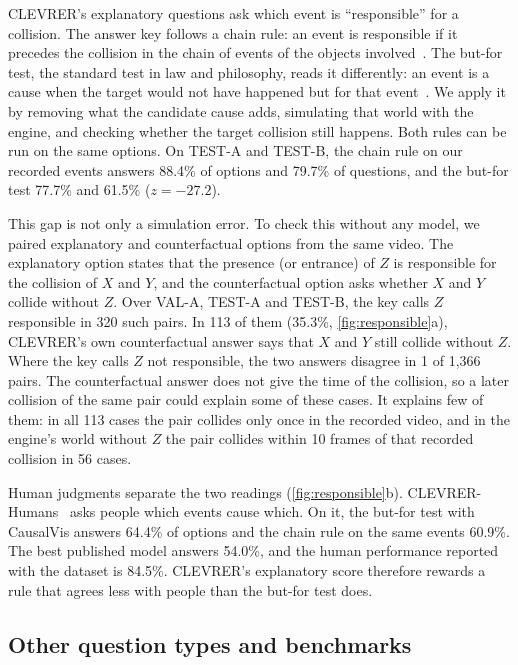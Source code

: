 \documentclass[10pt,twocolumn,letterpaper]{article}
\newcommand{\sys}{CausalVis}
\begin{document}
CLEVRER's explanatory questions ask which event is ``responsible'' for a collision.
The answer key follows a chain rule: an event is responsible if it precedes the collision in the chain of events of the objects involved~\cite{yi2020clevrer}.
The but-for test, the standard test in law and philosophy, reads it differently: an event is a cause when the target would not have happened but for that event~\cite{lewis1973causation,gerstenberg2021csm}.
We apply it by removing what the candidate cause adds, simulating that world with the engine, and checking whether the target collision still happens.
Both rules can be run on the same options.
On TEST-A and TEST-B, the chain rule on our recorded events answers 88.4\% of options and 79.7\% of questions, and the but-for test 77.7\% and 61.5\% ($z=-27.2$).

This gap is not only a simulation error.
To check this without any model, we paired explanatory and counterfactual options from the same video.
The explanatory option states that the presence (or entrance) of $Z$ is responsible for the collision of $X$ and $Y$, and the counterfactual option asks whether $X$ and $Y$ collide without $Z$.
Over VAL-A, TEST-A and TEST-B, the key calls $Z$ responsible in 320 such pairs.
In 113 of them (35.3\%, \cref{fig:responsible}a), CLEVRER's own counterfactual answer says that $X$ and $Y$ still collide without $Z$.
Where the key calls $Z$ not responsible, the two answers disagree in 1 of 1,366 pairs.
The counterfactual answer does not give the time of the collision, so a later collision of the same pair could explain some of these cases.
It explains few of them: in all 113 cases the pair collides only once in the recorded video, and in the engine's world without $Z$ the pair collides within 10 frames of that recorded collision in 56 cases.

Human judgments separate the two readings (\cref{fig:responsible}b).
CLEVRER-Humans~\cite{mao2022clevrerhumans} asks people which events cause which.
On it, the but-for test with \sys{} answers 64.4\% of options and the chain rule on the same events 60.9\%.
The best published model answers 54.0\%, and the human performance reported with the dataset is 84.5\%.
CLEVRER's explanatory score therefore rewards a rule that agrees less with people than the but-for test does.

\subsection{Other question types and benchmarks}
\label{sec:other}
\end{document}
